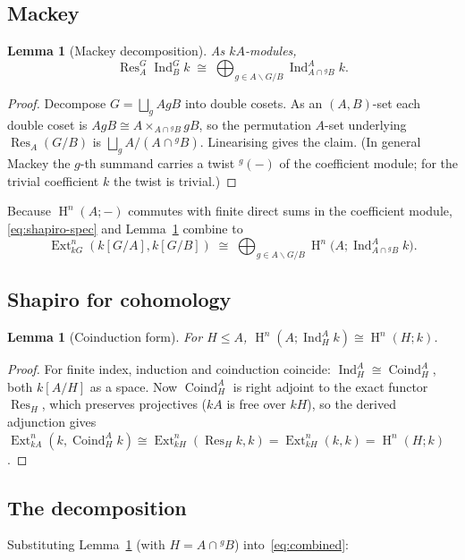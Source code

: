 \documentclass[11pt]{amsart}
\theoremstyle{plain}
\newtheorem{lemma}[theorem]{Lemma}
\theoremstyle{definition}
\DeclareMathOperator{\Ind}{Ind}
\DeclareMathOperator{\Res}{Res}
\DeclareMathOperator{\Coind}{Coind}
\DeclareMathOperator{\Ext}{Ext}
\DeclareMathOperator{\Hh}{H}
\newcommand{\conj}[2]{{}^{#1}\!#2}
\newcommand{\dcoset}[3]{#1\backslash #2/#3}
\begin{document}
\subsection{Mackey}
\begin{lemma}[Mackey decomposition]\label{lem:mackey}
As $kA$-modules,
\[
   \Res_A^G\Ind_B^G k\;\cong\;\bigoplus_{g\in \dcoset{A}{G}{B}}\Ind_{A\cap\conj{g}{B}}^A k .
\]
\end{lemma}
\begin{proof}
Decompose $G=\bigsqcup_{g} AgB$ into double cosets. As an $(A,B)$-set each double coset is
$AgB\cong A\times_{A\cap\conj{g}{B}}gB$, so the permutation $A$-set underlying $\Res_A(G/B)$
is $\bigsqcup_g A/(A\cap\conj{g}{B})$. Linearising gives the claim. (In general Mackey the
$g$-th summand carries a twist $\conj{g}{(-)}$ of the coefficient module; for the trivial
coefficient $k$ the twist is trivial.)
\end{proof}

Because $\Hh^n(A;-)$ commutes with finite direct sums in the coefficient module,
\eqref{eq:shapiro-spec} and Lemma~\ref{lem:mackey} combine to
\begin{equation}\label{eq:combined}
   \Ext^n_{kG}(k[G/A],k[G/B])\;\cong\;
   \bigoplus_{g\in\dcoset{A}{G}{B}}\Hh^n\!\bigl(A;\Ind_{A\cap\conj{g}{B}}^A k\bigr).
\end{equation}

\subsection{Shapiro for cohomology}
\begin{lemma}[Coinduction form]\label{lem:coind}
For $H\le A$, \; $\Hh^n(A;\Ind_H^A k)\cong \Hh^n(H;k)$.
\end{lemma}
\begin{proof}
For finite index, induction and coinduction coincide: $\Ind_H^A\cong\Coind_H^A$, both
$k[A/H]$ as a space. Now $\Coind_H^A$ is right adjoint to the exact functor $\Res_H$, which
preserves projectives ($kA$ is free over $kH$), so the derived adjunction gives
$\Ext^n_{kA}(k,\Coind_H^A k)\cong\Ext^n_{kH}(\Res_H k,k)=\Ext^n_{kH}(k,k)=\Hh^n(H;k)$.
\end{proof}

\subsection{The decomposition}
Substituting Lemma~\ref{lem:coind} (with $H=A\cap\conj{g}{B}$) into~\eqref{eq:combined}:
\end{document}
